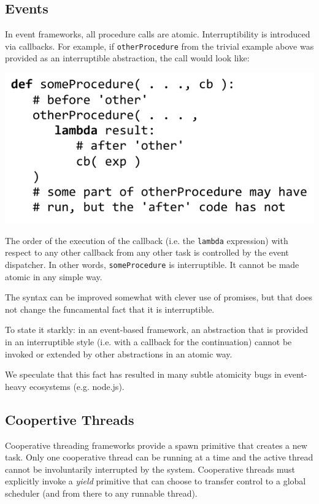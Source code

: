 \documentclass[9pt,preprint]{sigplanconf}
\begin{document}
\subsection{Events}

In event frameworks, all procedure calls are atomic.
Interruptibility is introduced via callbacks.
For example, if \texttt{otherProcedure} from the trivial example above was provided as an interruptible abstraction, the call would look like:

\includegraphics[scale=0.7]{trivial_call_event}

The order of the execution of the callback (i.e. the \texttt{lambda} expression) with  respect to any other callback from any other task is controlled by the event dispatcher.
In other words, \texttt{someProcedure} is interruptible.
It cannot be made atomic in any simple way.

The syntax can be improved somewhat with clever use of promises, but that does not change the funcamental fact that it is interruptible.

To state it starkly: in an event-based framework, an abstraction that is provided in an interruptible style (i.e. with a callback for the continuation) cannot be invoked or extended by other abstractions in an atomic way.

We speculate that this fact has resulted in many subtle atomicity bugs in event-heavy ecosystems (e.g. node.js).


\subsection{Coopertive Threads}

Cooperative threading frameworks provide a spawn primitive that creates a new task.
Only one cooperative thread can be running at a time and the active thread cannot be involuntarily interrupted by the system.
Cooperative threads must explicitly invoke a \emph{yield} primitive that can choose to transfer control to a global scheduler (and from there to any runnable thread).
\end{document}
